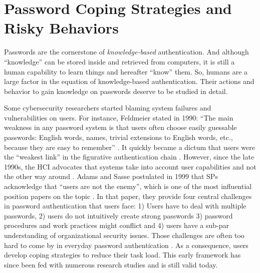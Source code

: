 	
\section{Password Coping Strategies and Risky Behaviors}\label{sec:rw:user-behavior}
Passwords are the cornerstone of \textit{knowledge-based} authentication. And although ``knowledge'' can be stored inside and retrieved from computers, it is still a human capability to learn things and hereafter ``know'' them. So, humans are a large factor in the equation of knowledge-based authentication. Their actions and behavior to gain knowledge on passwords deserve to be studied in detail. 

Some cybersecurity researchers started blaming system failures and vulnerabilities on users. For instance, Feldmeier \etal stated in 1990: ``The main weakness in any password system is that users often choose easily guessable passwords: English words, names, trivial extensions to English words, etc., because they are easy to remember'' \cite{Feldmeier1990UnixPasswordSecurity}. It quickly became a dictum that users were the ``weakest link'' in the figurative authentication chain \cite{Sasse2001WeakestLink}. However, since the late 1990s, the \gls{HCI} advocates that systems take into account user capabilities and not the other way around \cite{Sasse2005UsableSecurityPosition}. Adams and Sasse postulated in 1999 that \glspl{SP} acknowledge that ``users are not the enemy'', which is one of the most influential position papers on the topic \cite{Adams1999UsersEnemy}. In that paper, they provide four central challenges in password authentication that users face: 1) Users have to deal with multiple passwords, 2) users do not intuitively create strong passwords 3) password procedures and work practices might conflict and 4) users have a sub-par understanding of organizational security issues. Those challenges are often too hard to come by in everyday password authentication \cite{Dourish2004UserStrategiesEveryday}. As a consequence, users develop coping strategies to reduce their task load. This early framework has since been fed with numerous research studies and is still valid today. 



